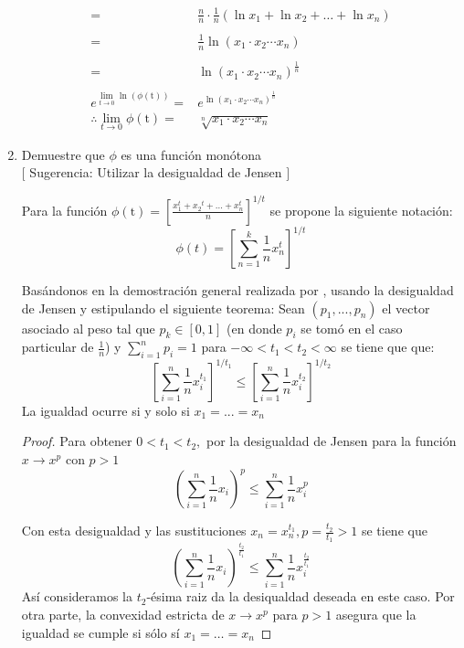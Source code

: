 \documentclass[a4paper,12pt]{article}
\begin{document}
\begin{enumerate}{}
\[\begin{array}{rl}
             = & \displaystyle\frac{n}{n} \cdot \displaystyle\frac{1}{n} \left( \ln{x_1} + \ln{x_2}+\ldots +\ln{x_n} \right)\\\\
             = & \displaystyle \frac{1}{n}\ln{(x_1\cdot x_2 \cdots x_n)}\\\\
             = & \ln{(x_1\cdot x_2 \cdots x_n)}^{\frac{1}{n}}\\\\
             e^{\displaystyle \lim_{ t\rightarrow 0} \ln (\phi(\mathrm{t}))}= &  e^{ \displaystyle\ln{(x_1\cdot x_2 \cdots x_n)}^{\frac{1}{n}}}\\
             \therefore \lim_{ t\rightarrow 0} \phi(\mathrm{t}) = &  \sqrt[n]{x_1\cdot x_2 \cdots x_n}
        \end{array}
        \]
    \item Demuestre que $\phi$ es una función monótona \\
    $[$ Sugerencia: Utilizar la desigualdad de Jensen $]$
    
    Para la función $\phi(\mathrm{t})= \displaystyle \left[\frac{x_{1}^{t}+x_{2}{ }^{t}+\ldots+x_{n}^{t}}{n}\right]^{1/t}$ se propone la siguiente notación: 
    $$\phi(t) = \left[\sum_{n=1}^k \frac{1}{n} x_n^t \right]^{1/t}$$
    
    Basándonos en la demostración general realizada por \cite{curioso}, usando la desigualdad de Jensen y estipulando el siguiente teorema:
    Sean $(p_1,...,p_n)$ el vector asociado al peso tal que $p_k\in[0,1]$ (en donde $p_i$ se tomó en el caso particular de $\frac{1}{n}$) y $\sum_{i=1}^n p_i=1$ para $-\infty<t_1<t_2<\infty$
    se tiene que que: $$ \left[\sum_{i=1}^n \frac{1}{n} x_i^{t_1} \right]^{1/t_1}\leq \left[\sum_{i=1}^n \frac{1}{n} x_i^{t_2} \right]^{1/t_2}$$
  La igualdad ocurre si y solo si $x_1=...=x_n$
    
    \begin{proof}
    Para obtener $0<t_1<t_2,$ por la desigualdad de Jensen para la función $x \rightarrow x^{p}$ con $p>1$
$$\left(\sum_{i=1}^{n} \frac{1}{n} x_{i}\right)^{p} \leq \sum_{i=1}^{n} \frac{1}{n}x_{i}^{p}$$

Con esta desigualdad y las sustituciones $x_{n}=x_{n}^{t_1}, p=\frac{t_2}{t_1}>1$ se tiene que
$$
\left(\sum_{i=1}^{n} \frac{1}{n} x_{i}\right)^{\frac{t_2}{t_1}} \leq \sum_{i=1}^{n} \frac{1}{n} x_{i}^{\frac{t_2}{t_1}}
$$
Así consideramos la $t_2$-ésima raiz da la desiqualdad deseada en este caso. Por otra parte, la convexidad estricta de $x \rightarrow x^{p}$ para $p>1$ asegura que la igualdad se cumple si sólo sí $x_{1}=\ldots=x_{n}$


\end{proof}
\end{enumerate}
\end{document}
